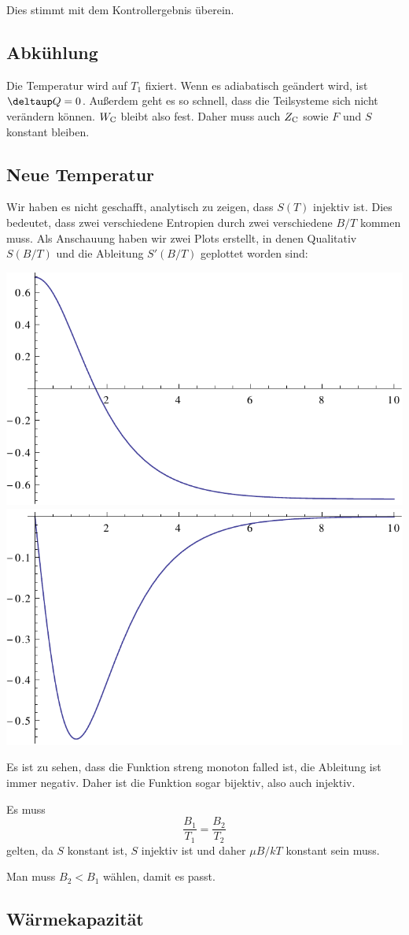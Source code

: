 Dies stimmt mit dem Kontrollergebnis überein.

\subsection{Abkühlung}

Die Temperatur wird auf $T_1$ fixiert. Wenn es adiabatisch geändert wird, ist
$\deltaup Q = 0$. Außerdem geht es so schnell, dass die Teilsysteme sich nicht
verändern können. $W_\text C$ bleibt also fest. Daher muss auch $Z_\text C$
sowie $F$ und $S$ konstant bleiben.

\subsection{Neue Temperatur}

Wir haben es nicht geschafft, analytisch zu zeigen, dass $S(T)$ injektiv ist.
Dies bedeutet, dass zwei verschiedene Entropien durch zwei verschiedene $B/T$
kommen muss. Als Anschauung haben wir zwei Plots erstellt, in denen Qualitativ
$S(B/T)$ und die Ableitung $S'(B/T)$ geplottet worden sind:

\includegraphics[width=.45\textwidth]{2b-S.pdf}
\hfill
\includegraphics[width=.45\textwidth]{2b-dS.pdf}

Es ist zu sehen, dass die Funktion streng monoton falled ist, die Ableitung ist
immer negativ. Daher ist die Funktion sogar bijektiv, also auch injektiv.

Es muss
\[
    \frac{B_1}{T_1} = \frac{B_2}{T_2}
\]
gelten, da $S$ konstant ist, $S$ injektiv ist und daher $\mu B/kT$ konstant
sein muss.

Man muss $B_2 < B_1$ wählen, damit es passt.

\subsection{Wärmekapazität}

